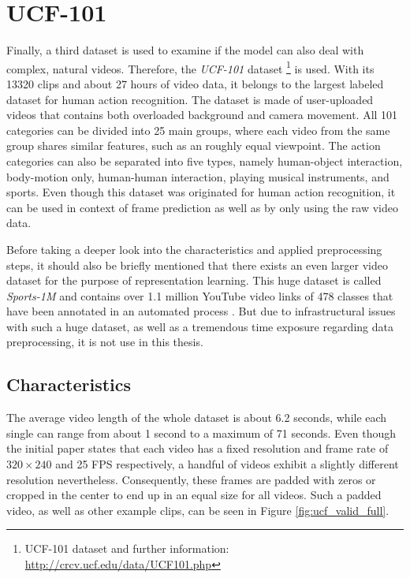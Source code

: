 \section{UCF-101} \label{sec:ds_ucf}

Finally, a third dataset is used to examine if the model can also deal with complex, natural videos. Therefore, the \textit{UCF-101} dataset \parencite{ucf}\footnote{UCF-101 dataset and further information: \url{http://crcv.ucf.edu/data/UCF101.php}} is used. With its \num{13320} clips and about \num{27} hours of video data, it belongs to the largest labeled dataset for human action recognition. The dataset is made of user-uploaded videos that contains both overloaded background and camera movement. All \num{101} categories can be divided into \num{25} main groups,  where each video from the same group shares similar features, such as an roughly equal viewpoint. The action categories can also be separated into five types, namely human-object interaction, body-motion only, human-human interaction, playing musical instruments, and sports. Even though this dataset was originated for human action recognition, it can be used in context of frame prediction as well as by only using the raw video data.

Before taking a deeper look into the characteristics and applied preprocessing steps, it should also be briefly mentioned that there exists an even larger video dataset for the purpose of representation learning. This huge dataset is called \textit{Sports-1M} and contains over \num{1.1} million YouTube video links of \num{478} classes that have been annotated in an automated process \parencite{large_video_class}. But due to infrastructural issues with such a huge dataset, as well as a tremendous time exposure regarding data preprocessing, it is not use in this thesis.


\subsection{Characteristics}

The average video length of the whole dataset is about \num{6.2} seconds, while each single can range from about \num{1} second to a maximum of \num{71} seconds. Even though the initial paper states that each video has a fixed resolution and frame rate of $ 320 \times 240 $ and \num{25} FPS respectively, a handful of videos exhibit a slightly different resolution nevertheless. Consequently, these frames are padded with zeros or cropped in the center to end up in an equal size for all videos. Such a padded video, as well as other example clips, can be seen in Figure \ref{fig:ucf_valid_full}.

